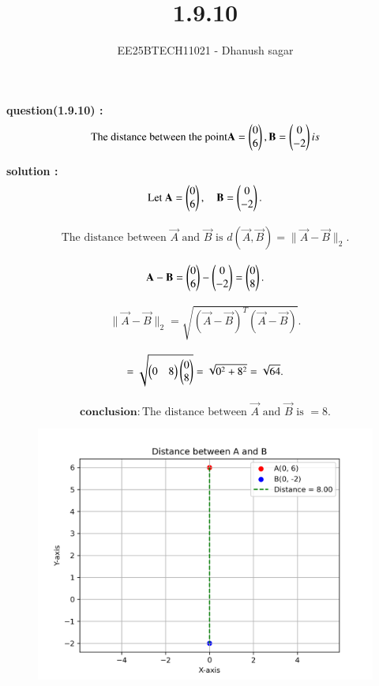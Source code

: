 \documentclass[journal]{IEEEtran}
\title{1.9.10}
\author{EE25BTECH11021 - Dhanush sagar}
\begin{document}
\maketitle

\renewcommand{\thefigure}{\theenumi}
\renewcommand{\thetable}{\theenumi}

\textbf{question(1.9.10) :}
\begin{align}
\text{The distance between the point}  \mathbf{A} = \begin{pmatrix}0\\6\end{pmatrix},  
\mathbf{B} = \begin{pmatrix}0\\-2\end{pmatrix} is
\end{align}

\textbf{solution :}
\begin{align}
\text{Let } 
\mathbf{A} = \begin{pmatrix}0\\6\end{pmatrix}, \quad 
\mathbf{B} = \begin{pmatrix}0\\-2\end{pmatrix}.
\end{align}

\begin{align}
\text{The distance between } \vec{A} \text{ and } \vec{B} \text{ is }
d(\vec{A},\vec{B}) = \|\vec{A}-\vec{B}\|_2.
\end{align}

\begin{align}
\mathbf{A}-\mathbf{B} =
\begin{pmatrix}0\\6\end{pmatrix} - \begin{pmatrix}0\\-2\end{pmatrix} = \begin{pmatrix}0\\8\end{pmatrix}.
\end{align}

\begin{align}
\|\vec{A}-\vec{B}\|_2
= \sqrt{(\vec{A}-\vec{B})^T (\vec{A}-\vec{B})}.
\end{align}

\begin{align}
= \sqrt{\begin{pmatrix}0 & 8\end{pmatrix}\begin{pmatrix}0\\8\end{pmatrix}}
= \sqrt{0^2 + 8^2}
= \sqrt{64}.
\end{align}

\begin{align}
\textbf{conclusion} : \text{The distance between } \vec{A} \text{ and } \vec{B} \text{ is } = 8.
\end{align}
\begin{figure}
    \centering
    \includegraphics[width=0.45\columnwidth]{figs/fig1.png}
    \caption*{}
    \label{fig:fig1}
\end{figure}
\end{document}
